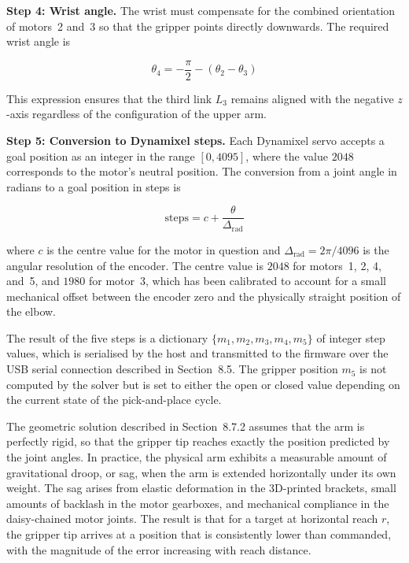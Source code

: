 \textbf{Step 4: Wrist angle.} The wrist must compensate for the 
combined orientation of motors~2 and~3 so that the gripper points 
directly downwards. The required wrist angle is

\begin{equation}
    \theta_4 = -\frac{\pi}{2} - (\theta_2 - \theta_3)
\end{equation}

This expression ensures that the third link $L_3$ remains aligned 
with the negative $z$-axis regardless of the configuration of the 
upper arm.

\textbf{Step 5: Conversion to Dynamixel steps.} Each Dynamixel 
servo accepts a goal position as an integer in the range 
$[0, 4095]$, where the value $2048$ corresponds to the motor's 
neutral position. The conversion from a joint angle in radians 
to a goal position in steps is

\begin{equation}
    \mathrm{steps} = c + \frac{\theta}{\Delta_{\mathrm{rad}}}
\end{equation}

where $c$ is the centre value for the motor in question and 
$\Delta_{\mathrm{rad}} = 2\pi / 4096$ is the angular resolution 
of the encoder. The centre value is $2048$ for motors~1, 2, 4, 
and~5, and $1980$ for motor~3, which has been calibrated to 
account for a small mechanical offset between the encoder zero 
and the physically straight position of the elbow.

The result of the five steps is a dictionary 
$\{m_1, m_2, m_3, m_4, m_5\}$ of integer step values, which is 
serialised by the host and transmitted to the firmware over the 
USB serial connection described in Section~8.5. The gripper 
position $m_5$ is not computed by the solver but is set to 
either the open or closed value depending on the current state 
of the pick-and-place cycle.



The geometric solution described in Section~8.7.2 assumes that the 
arm is perfectly rigid, so that the gripper tip reaches exactly 
the position predicted by the joint angles. In practice, the 
physical arm exhibits a measurable amount of gravitational droop, 
or sag, when the arm is extended horizontally under its own 
weight. The sag arises from elastic deformation in the 
3D-printed brackets, small amounts of backlash in the motor 
gearboxes, and mechanical compliance in the daisy-chained motor 
joints. The result is that for a target at horizontal reach $r$, 
the gripper tip arrives at a position that is consistently lower 
than commanded, with the magnitude of the error increasing with 
reach distance.

